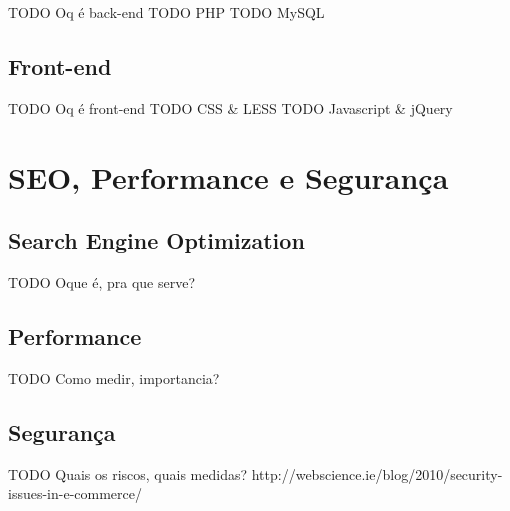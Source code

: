 TODO Oq é back-end
TODO PHP
TODO MySQL

\subsection{Front-end}

TODO Oq é front-end
TODO CSS & LESS
TODO Javascript & jQuery

\section{SEO, Performance e Segurança}

\subsection{Search Engine Optimization}

TODO Oque é, pra que serve?

\subsection{Performance}

TODO Como medir, importancia?

\subsection{Segurança}

TODO Quais os riscos, quais medidas?
http://webscience.ie/blog/2010/security-issues-in-e-commerce/
